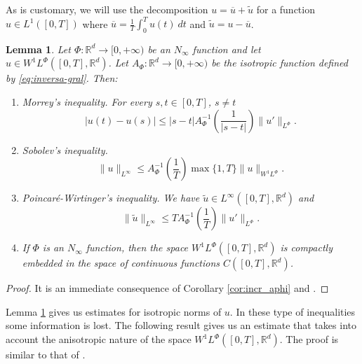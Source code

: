 \documentclass[twoside]{article}
\newtheorem{lem}[thm]{Lemma}
\theoremstyle{remark}
\newcommand{\orlnor}{\|_{L^{\Phi}}}
\newcommand{\linf}{\|_{L^{\infty}}}
\newcommand{\lphi}{L^{\Phi}}
\newcommand{\wphi}{W^{1}\lphi}
\newcommand{\sobnor}{\|_{W^{1}\lphi}}
\newcommand{\rr}{\mathbb{R}}
\renewcommand{\leq}{\leqslant}
\begin{document}
 As is customary, we will use the decomposition $u=\overline{u}+\widetilde{u}$ for a function $u\in L^1([0,T])$  where $\overline{u} =\frac1T\int_0^T u(t)\ dt$ and $\widetilde{u}=u-\overline{u}$.



\begin{lem}\label{lem:inclusion orlicz} Let $\Phi:\rr^d\to [0,+\infty)$ be an $N_{\infty}$
function and let \linebreak[4]$u\in\wphi\left([0,T],\rr^d\right)$. Let 
$A_{\Phi}: \rr^d \to  [0,+\infty)$ be the isotropic function defined by \eqref{eq:inversa-gral}. Then:
 
\begin{enumerate}
  \item \emph{Morrey's inequality}.   For every $s,t\in [0,T]$, $s\neq t$
  \begin{equation}
   |u(t)-u(s)| \leq
  |s-t|A_{\Phi}^{-1}\left(\frac{1}{|s-t|}\right)\|u'\orlnor.\tag{M.I}\label{in-sob-cont}
  \end{equation}

  \item \emph{Sobolev's inequality}. 
  \begin{equation}
   \|u\linf \leq A_\Phi^{-1}\left(\frac{1}{T}\right)\max\{1,T\}\|u\sobnor.\tag{S.I}\label{eq:sobolev}
  \end{equation}

  \item \emph{Poincar\'e-Wirtinger's inequality}. We have $\widetilde{u}\in L^{\infty}\left([0,T],\rr^d\right)$ and 
    \begin{equation}\label{eq:wirtinger-iso}
    \|\widetilde{u}\|_{L^{\infty}} \leq T A_{\Phi}^{-1}\left(\frac{1}{T}\right)\| u'\orlnor.\tag{P-W.I}
    \end{equation}
    
    \item\label{it:embeding} If $\Phi$ is an $N_{\infty}$ function, then the space $\wphi\left([0,T],\rr^d\right)$ is compactly embedded in the space of  continuous functions $C([0,T],\rr^d)$.
  \end{enumerate}

\end{lem}

\begin{proof}  It is an immediate consequence of Corollary \ref{cor:incr_aphi} and \cite[Lemma 2.1, Cor. 2.2]{ABGMS2015}.
\end{proof}

Lemma \ref{lem:inclusion orlicz} gives us estimates for isotropic norms of $u$. In these type of inequalities some information is lost.  The following result gives us an estimate that takes into account the anisotropic nature of the space $\wphi\left([0,T],\rr^d\right)$. The proof is similar to  that of  \cite[Thm. 4.5]{chamra2017anisotropic}.
\end{document}
